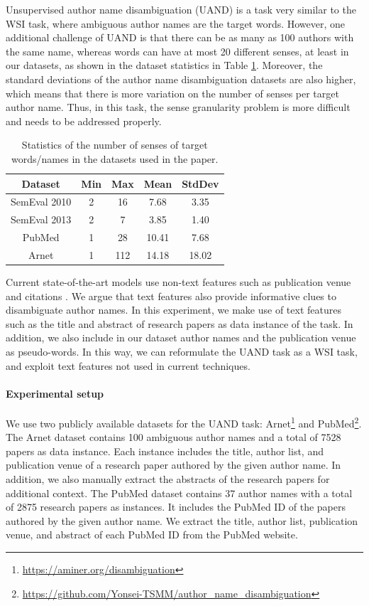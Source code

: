\documentclass[letterpaper]{article} %
\begin{document}
Unsupervised author name disambiguation (UAND) is a task very similar to the WSI task, where ambiguous author names are the target words. However, one additional challenge of UAND is that there can be as many as 100 authors with the same name, whereas words can have at most 20 different senses, at least in our datasets, as shown in the dataset statistics in Table \ref{tab:stat}. Moreover, the standard deviations of the author name disambiguation datasets are also higher, which means that there is more variation on the number of senses per target author name. Thus, in this task, the sense granularity problem is more difficult and needs to be addressed properly.

\begin{table}[t]
    \centering
    \begin{tabular}{|c|cccc|}
        \hline
        Dataset & Min & Max & Mean & StdDev \\
        \hline
        SemEval 2010 & 2 & 16 & 7.68 & 3.35 \\ \hline
        SemEval 2013 & 2 & 7 & 3.85 & 1.40 \\ \hline
        PubMed & 1 & 28 & 10.41 & 7.68 \\ \hline
        Arnet & 1 & 112 & 14.18 & 18.02 \\
        \hline
    \end{tabular}
    \caption{Statistics of the number of senses of target words/names in the datasets used in the paper.}
    \label{tab:stat}
\end{table}

Current state-of-the-art models use non-text features such as publication venue and citations \cite{tang2012unified}.  We argue that text features also provide informative clues to disambiguate author names. In this experiment, we make use of text features such as the title and abstract of research papers as data instance of the task. In addition, we also include in our dataset author names and the publication venue as pseudo-words. In this way, we can reformulate the UAND task as a WSI task, and exploit text features not used in current techniques.

\paragraph{Experimental setup}

We use two publicly available datasets for the UAND task: Arnet\footnote{\url{https://aminer.org/disambiguation}} and PubMed\footnote{\url{https://github.com/Yonsei-TSMM/author_name_disambiguation}}. The Arnet dataset contains 100 ambiguous author names and a total of 7528 papers as data instance. Each instance includes the title, author list, and publication venue of a research paper authored by the given author name. In addition, we also manually extract the abstracts of the research papers for additional context.
The PubMed dataset contains 37 author names with a total of 2875 research papers as instances. It includes the PubMed ID of the papers authored by the given author name. We extract the title, author list, publication venue, and abstract of each PubMed ID from the PubMed website.
\end{document}
